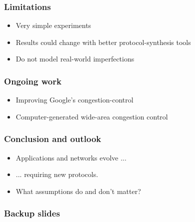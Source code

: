 \documentclass[svgnames]{beamer}
\begin{document}
\begin{Large}
\begin{frame}
\frametitle{Limitations}
\begin{itemize}
\item<2-> Very simple experiments
\item<3-> Results could change with better protocol-synthesis tools
\item<4-> Do not model real-world imperfections
\end{itemize}
\end{frame}
\begin{frame}

\frametitle{Ongoing work}
\begin{itemize}
\item<2-> Improving Google's congestion-control
\item<3-> Computer-generated wide-area congestion control
\end{itemize}
\end{frame}

\begin{frame}
\frametitle{Conclusion and outlook}
\begin{itemize}
\item<2-> Applications and networks evolve ...
\item<3-> ... requiring new protocols.
\item<4-> What assumptions do and don't matter?
\end{itemize}
\end{frame}

\end{Large}

\begin{frame}
\frametitle{Backup slides}
\end{frame}







\end{document}
